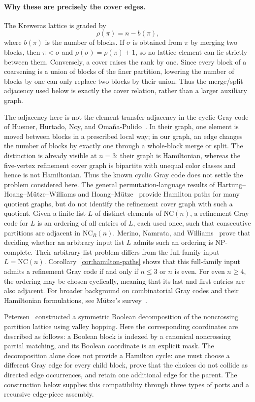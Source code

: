 \documentclass[12pt]{article}
\newcommand{\NCR}{\mathrm{NC}_R}
\newcommand{\NC}{\mathrm{NC}}
\begin{document}
\paragraph{Why these are precisely the cover edges.}
The Kreweras lattice is graded by
\[
 \rho(\pi)=n-b(\pi),
\]
where $b(\pi)$ is the number of blocks.  If $\sigma$ is obtained from $\pi$
by merging two blocks, then $\pi<\sigma$ and
$\rho(\sigma)=\rho(\pi)+1$, so no lattice element can lie strictly between
them.  Conversely, a cover raises the rank by one.  Since every block of a
coarsening is a union of blocks of the finer partition, lowering the number
of blocks by one can only replace two blocks by their union.  Thus the
merge/split adjacency used below is exactly the cover relation, rather than
a larger auxiliary graph.

The adjacency here is not the element-transfer adjacency in the cyclic Gray
code of Huemer, Hurtado, Noy, and Oma\~na-Pulido~\cite{HHNP}.  In their graph,
one element is moved between blocks in a prescribed local way; in our graph,
an edge changes the number of blocks by exactly one through a whole-block
merge or split.  The distinction is already visible at $n=3$: their graph is
Hamiltonian, whereas the five-vertex refinement cover graph is bipartite with
unequal color classes and hence is not Hamiltonian.  Thus the known cyclic
Gray code does not settle the problem considered here.  The general
permutation-language results of Hartung--Hoang--M\"utze--Williams and
Hoang--M\"utze~\cite{HHMW,HM} provide Hamilton paths for many quotient
graphs, but do not identify the refinement cover graph with such a quotient.
Given a finite list $L$ of distinct elements of $\NC(n)$, a refinement Gray
code for $L$ is an ordering of all entries of $L$, each used once, such that
consecutive partitions are adjacent in $\NCR(n)$.  Merino, Namrata, and
Williams~\cite{MNW} prove that deciding whether an arbitrary input list $L$
admits such an ordering is NP-complete.  Their arbitrary-list problem differs
from the full-family input $L=\NC(n)$.  Corollary~\ref{cor:hamilton-paths}
shows that this full-family input admits a refinement Gray code if and only if
$n\leq3$ or $n$ is even.  For even $n\geq4$, the ordering may be chosen
cyclically, meaning that its last and first entries are also adjacent.  For
broader background on combinatorial Gray codes and their Hamiltonian
formulations, see M\"utze's survey~\cite{M}.

Petersen~\cite{Pet} constructed a symmetric Boolean decomposition of the
noncrossing partition lattice using valley hopping.  Here the corresponding
coordinates are described as follows: a Boolean block is indexed by a canonical
noncrossing partial matching, and its Boolean coordinate is an explicit mask.
The decomposition alone does not provide a Hamilton cycle: one must choose a
different Gray edge for every child block, prove that the choices do not
collide as directed edge occurrences, and retain one additional edge for the
parent.  The construction below supplies this compatibility through three
types of ports and a recursive edge-piece assembly.
\end{document}

